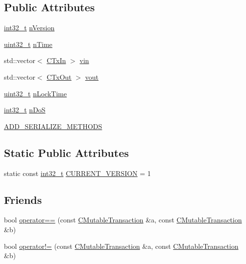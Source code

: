 \subsection*{Public Attributes}
\begin{DoxyCompactItemize}
\item 
\hyperlink{stdint_8h_ab1967d8591af1a4e48c37fd2b0f184d0}{int32\+\_\+t} \hyperlink{struct_c_mutable_transaction_a23d7f377dce887f5b37539b0bf51733e}{n\+Version}
\item 
\hyperlink{stdint_8h_a435d1572bf3f880d55459d9805097f62}{uint32\+\_\+t} \hyperlink{struct_c_mutable_transaction_a7638f0f1222fac9b3a258cd4bf7bc13e}{n\+Time}
\item 
std\+::vector$<$ \hyperlink{class_c_tx_in}{C\+Tx\+In} $>$ \hyperlink{struct_c_mutable_transaction_ad6b1a0a773293fd153a1d384923631da}{vin}
\item 
std\+::vector$<$ \hyperlink{class_c_tx_out}{C\+Tx\+Out} $>$ \hyperlink{struct_c_mutable_transaction_aca14a252c78e4af2dfe68d7ea67a77dc}{vout}
\item 
\hyperlink{stdint_8h_a435d1572bf3f880d55459d9805097f62}{uint32\+\_\+t} \hyperlink{struct_c_mutable_transaction_ae9685a37d424cd00e3badda28260c848}{n\+Lock\+Time}
\item 
\hyperlink{stdint_8h_ab1967d8591af1a4e48c37fd2b0f184d0}{int32\+\_\+t} \hyperlink{struct_c_mutable_transaction_a08262710c3dfcc221c48df31dc7f963e}{n\+Do\+S}
\item 
\hyperlink{struct_c_mutable_transaction_addcc243750be876ebb36ad4badd8aff8}{A\+D\+D\+\_\+\+S\+E\+R\+I\+A\+L\+I\+Z\+E\+\_\+\+M\+E\+T\+H\+O\+D\+S}
\end{DoxyCompactItemize}
\subsection*{Static Public Attributes}
\begin{DoxyCompactItemize}
\item 
static const \hyperlink{stdint_8h_ab1967d8591af1a4e48c37fd2b0f184d0}{int32\+\_\+t} \hyperlink{struct_c_mutable_transaction_acd08f5ca3f1ffa5c65750e6b4594a1e7}{C\+U\+R\+R\+E\+N\+T\+\_\+\+V\+E\+R\+S\+I\+O\+N} = 1
\end{DoxyCompactItemize}
\subsection*{Friends}
\begin{DoxyCompactItemize}
\item 
bool \hyperlink{struct_c_mutable_transaction_a5ca3175c47a2ad544682565ce6c07502}{operator==} (const \hyperlink{struct_c_mutable_transaction}{C\+Mutable\+Transaction} \&a, const \hyperlink{struct_c_mutable_transaction}{C\+Mutable\+Transaction} \&b)
\item 
bool \hyperlink{struct_c_mutable_transaction_a472fffdfa068323daec94304dc9fbfc1}{operator!=} (const \hyperlink{struct_c_mutable_transaction}{C\+Mutable\+Transaction} \&a, const \hyperlink{struct_c_mutable_transaction}{C\+Mutable\+Transaction} \&b)
\end{DoxyCompactItemize}


